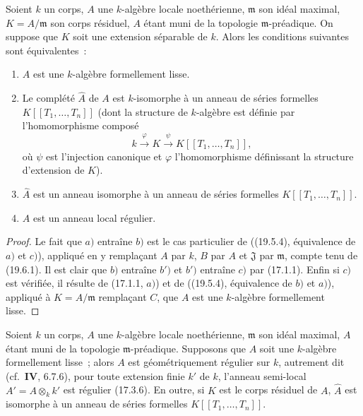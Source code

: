 \begin{theorem}[19.6.4]
\label{0.19.6.4-fr}
Soient $k$ un corps, $A$ une $k$-algèbre locale noethérienne, $\mathfrak m$ son
idéal maximal, $K=A/\mathfrak m$ son corps résiduel, $A$ étant muni de la
topologie $\mathfrak m$-préadique. On suppose que $K$ soit une extension
\textup{séparable} de $k$. Alors les conditions suivantes sont équivalentes~:
\begin{enumerate}
  \item[\textup{a)}] $A$ est une $k$-algèbre formellement lisse.
  \item[\textup{b)}] Le complété $\widehat A$ de $A$ est $k$-isomorphe à un anneau de
  séries formelles $K[[T_1,\ldots,T_n]]$ \textup{(dont la structure de $k$-algèbre est
  définie par l'homomorphisme composé}
  \[
    k\xrightarrow{\varphi}K\xrightarrow{\psi}K[[T_1,\ldots,T_n]],
  \]
  \textup{où $\psi$ est l'injection canonique et $\varphi$ l'homomorphisme définissant
  la structure d'extension de $K$)}.
  \item[\textup{b')}] $\widehat A$ est un anneau isomorphe à un anneau de séries
  formelles $K[[T_1,\ldots,T_n]]$.
  \item[\textup{c)}] $A$ est un anneau local régulier.
\end{enumerate}
\end{theorem}

\begin{proof}
Le fait que $a)$ entraîne $b)$ est le cas particulier de ((19.5.4),
équivalence de $a)$ et $c)$), appliqué en y remplaçant $A$ par $k$, $B$ par
$A$ et $\mathfrak J$ par $\mathfrak m$, compte tenu de (19.6.1). Il est clair
que $b)$ entraîne $b')$ et $b')$ entraîne $c)$ par (17.1.1). Enfin si $c)$ est
vérifiée, il résulte de (17.1.1, $a)$) et de ((19.5.4), équivalence de $b)$ et
$a)$), appliqué à $K=A/\mathfrak m$ remplaçant $C$, que $A$ est une
$k$-algèbre formellement lisse.
\end{proof}

\begin{corollary}[19.6.5]
\label{0.19.6.5-fr}
Soient $k$ un corps, $A$ une $k$-algèbre locale noethérienne, $\mathfrak m$ son
idéal maximal, $A$ étant muni de la topologie $\mathfrak m$-préadique.
Supposons que $A$ soit une $k$-algèbre formellement lisse~; alors $A$ est
géométriquement régulier sur $k$, autrement dit \textup{(cf.~$\mathbf{IV}$, 6.7.6)},
pour toute extension finie $k'$ de $k$, l'anneau semi-local
$A'=A\otimes_k k'$ est régulier \textup{(17.3.6)}. En outre, si $K$ est le corps
résiduel de $A$, $\widehat A$ est isomorphe à un anneau de séries formelles
$K[[T_1,\ldots,T_n]]$.
\end{corollary}

